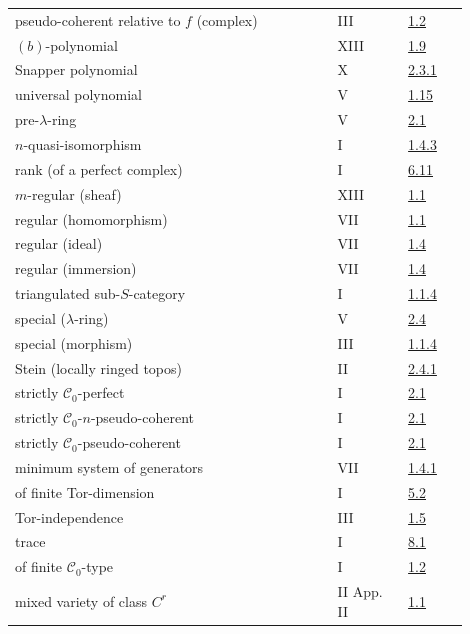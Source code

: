 \begin{longtable}{@{}>{\raggedright\arraybackslash}p{0.64\linewidth}>{\raggedright\arraybackslash}p{0.14\linewidth}>{\raggedright\arraybackslash}p{0.12\linewidth}@{}}
pseudo-coherent relative to \(f\) (complex) & III & \hyperlink{sga6.e03.def.1-2}{1.2}\\
\((b)\)-polynomial & XIII & \hyperlink{sga6.e13.def.1-9}{1.9}\\
Snapper polynomial & X & \hyperlink{sga6.e10.prop.2-3-1}{2.3.1}\\
universal polynomial & V & \hyperlink{sga6.e05.para.1-15}{1.15}\\
pre-\(\lambda\)-ring & V & \hyperlink{sga6.e05.def.2-1}{2.1}\\
\(n\)-quasi-isomorphism & I & \hyperlink{sga6.e01.def.1-4-3}{1.4.3}\\
rank (of a perfect complex) & I & \hyperlink{sga6.e01.def.6-11}{6.11}\\
\(m\)-regular (sheaf) & XIII & \hyperlink{sga6.e13.def.1-1}{1.1}\\
regular (homomorphism) & VII & \hyperlink{sga6.e07.def.1-1}{1.1}\\
regular (ideal) & VII & \hyperlink{sga6.e07.def.1-4}{1.4}\\
regular (immersion) & VII & \hyperlink{sga6.e07.def.1-4}{1.4}\\
triangulated sub-\(S\)-category & I & \hyperlink{sga6.e01.para.1-1-4}{1.1.4}\\
special (\(\lambda\)-ring) & V & \hyperlink{sga6.e05.def.2-4}{2.4}\\
special (morphism) & III & \hyperlink{sga6.e03.lem.1-1-4}{1.1.4}\\
Stein (locally ringed topos) & II & \hyperlink{sga6.e02.def.2-4-1}{2.4.1}\\
strictly \(\mathcal C_0\)-perfect & I & \hyperlink{sga6.e01.def.2-1}{2.1}\\
strictly \(\mathcal C_0\)-\(n\)-pseudo-coherent & I & \hyperlink{sga6.e01.def.2-1}{2.1}\\
strictly \(\mathcal C_0\)-pseudo-coherent & I & \hyperlink{sga6.e01.def.2-1}{2.1}\\
minimum system of generators & VII & \hyperlink{sga6.e07.def.1-4}{1.4.1}\\
of finite Tor-dimension & I & \hyperlink{sga6.e01.def.5-2}{5.2}\\
Tor-independence & III & \hyperlink{sga6.e03.def.1-5}{1.5}\\
trace & I & \hyperlink{sga6.e01.para.8-1}{8.1}\\
of finite \(\mathcal C_0\)-type & I & \hyperlink{sga6.e01.sec.1.2}{1.2}\\
mixed variety of class \(C^r\) & II App. II & \hyperlink{sga6.e02.sec.1.1}{1.1}\\
\bottomrule
\end{longtable}
\endgroup

